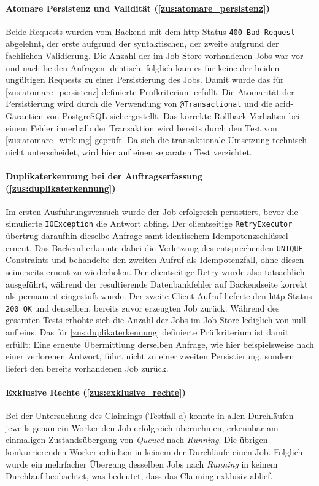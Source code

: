 \paragraph{Atomare Persistenz und Validität (\ref{zus:atomare_persistenz})}
\label{erg:atomare_persistenz}
Beide Requests wurden vom Backend mit dem \gls{http}-Status \texttt{400 Bad Request} abgelehnt, der erste aufgrund der
syntaktischen, der zweite aufgrund der fachlichen Validierung.
Die Anzahl der im Job-Store vorhandenen Jobs war vor und nach beiden Anfragen identisch, folglich kam es für keine der beiden
ungültigen Requests zu einer Persistierung des Jobs.
Damit wurde das für \ref{zus:atomare_persistenz} definierte Prüfkriterium erfüllt.
Die Atomarität der Persistierung wird durch die Verwendung von \texttt{@Transactional} und die \gls{acid}-Garantien von
PostgreSQL sichergestellt.
Das korrekte Rollback-Verhalten bei einem Fehler innerhalb der Transaktion wird bereits durch den Test von \ref{zus:atomare_wirkung} geprüft.
Da sich die transaktionale Umsetzung technisch nicht unterscheidet, wird hier auf einen separaten Test verzichtet.

\paragraph{Duplikaterkennung bei der Auftragserfassung (\ref{zus:duplikaterkennung})}
\label{erg:duplikaterkennung}
Im ersten Ausführungsversuch wurde der Job erfolgreich persistiert, bevor die simulierte \texttt{IOException} die Antwort abfing.
Der clientseitige \texttt{RetryExecutor} übertrug daraufhin dieselbe Anfrage samt identischem Idempotenzschlüssel erneut.
Das Backend erkannte dabei die Verletzung des entsprechenden \texttt{UNIQUE}-Constraints und behandelte den zweiten Aufruf
als Idempotenzfall, ohne diesen seinerseits erneut zu wiederholen.
Der clientseitige Retry wurde also tatsächlich ausgeführt, während der resultierende Datenbankfehler auf Backendseite
korrekt als permanent eingestuft wurde.
Der zweite Client-Aufruf lieferte den \gls{http}-Status \texttt{200 OK} und denselben, bereits zuvor erzeugten Job zurück.
Während des gesamten Tests erhöhte sich die Anzahl der Jobs im Job-Store lediglich von null auf eins.
Das für \ref{zus:duplikaterkennung} definierte Prüfkriterium ist damit erfüllt: Eine erneute Übermittlung derselben
Anfrage, wie hier beispielsweise nach einer verlorenen Antwort, führt nicht zu einer zweiten Persistierung, sondern liefert
den bereits vorhandenen Job zurück.

\paragraph{Exklusive Rechte (\ref{zus:exklusive_rechte})}
\label{erg:exklusive_rechte}
Bei der Untersuchung des Claimings (Testfall a) konnte in allen Durchläufen jeweils genau ein Worker den Job
erfolgreich übernehmen, erkennbar am einmaligen Zustandsübergang von \textit{Queued} nach \textit{Running}.
Die übrigen konkurrierenden Worker erhielten in keinem der Durchläufe einen Job.
Folglich wurde ein mehrfacher Übergang desselben Jobs nach \textit{Running} in keinem Durchlauf beobachtet, was bedeutet,
dass das Claiming exklusiv ablief.

